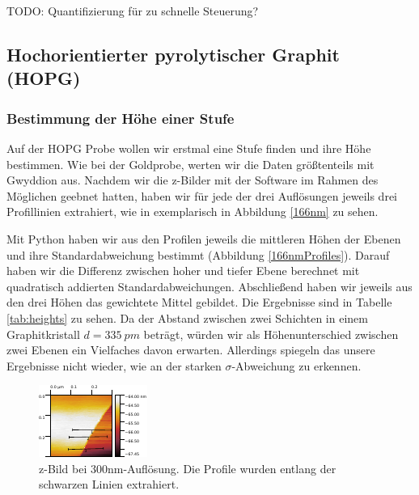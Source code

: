 TODO: Quantifizierung für zu schnelle Steuerung?


\subsection{Hochorientierter pyrolytischer Graphit (HOPG)}
\subsubsection{Bestimmung der Höhe einer Stufe}

Auf der HOPG Probe wollen wir erstmal eine Stufe finden und ihre Höhe bestimmen. Wie bei der Goldprobe, werten wir die Daten größtenteils mit Gwyddion aus. Nachdem wir die z-Bilder mit der Software im Rahmen des Möglichen geebnet hatten, haben wir für jede der drei Auflösungen jeweils drei Profillinien extrahiert, wie in exemplarisch in Abbildung \ref{166nm} zu sehen.

Mit Python haben wir aus den Profilen jeweils die mittleren Höhen der Ebenen und ihre Standardabweichung bestimmt (Abbildung \ref{166nmProfiles}). Darauf haben wir die Differenz zwischen hoher und tiefer Ebene berechnet mit quadratisch addierten Standardabweichungen. Abschließend haben wir jeweils aus den drei Höhen das gewichtete Mittel gebildet. Die Ergebnisse sind in Tabelle \ref{tab:heights} zu sehen. Da der Abstand zwischen zwei Schichten in einem Graphitkristall $d = \SI{335}{pm}$ beträgt, würden wir als Höhenunterschied zwischen zwei Ebenen ein Vielfaches davon erwarten. Allerdings spiegeln das unsere Ergebnisse nicht wieder, wie an der starken $\sigma$-Abweichung zu erkennen.

\begin{figure}[H]
\centering
\includegraphics[width=\textwidth]{../Gwyddion/HOPG/300nm.pdf}
\caption{z-Bild bei {300}{nm}-Auflösung. Die Profile wurden entlang der schwarzen Linien extrahiert.}
\label{300nm}
\end{figure}	

